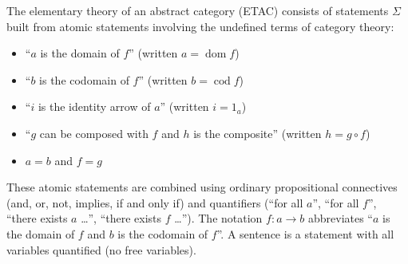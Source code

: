 The elementary theory of an abstract category (ETAC) consists of statements $\Sigma$ built from atomic statements involving the undefined terms of category theory:

\begin{itemize}
\item ``$a$ is the domain of $f$'' \quad (written $a = \operatorname{dom} f$)
\item ``$b$ is the codomain of $f$'' \quad (written $b = \operatorname{cod} f$)
\item ``$i$ is the identity arrow of $a$'' \quad (written $i = 1_a$)
\item ``$g$ can be composed with $f$ and $h$ is the composite'' \quad (written $h = g \circ f$)
\item $a = b$ and $f = g$
\end{itemize}

These atomic statements are combined using ordinary propositional connectives (and, or, not, implies, if and only if) and quantifiers (``for all $a$'', ``for all $f$'', ``there exists $a$ \ldots'', ``there exists $f$ \ldots''). The notation $f : a \rightarrow b$ abbreviates ``$a$ is the domain of $f$ and $b$ is the codomain of $f$''. A sentence is a statement with all variables quantified (no free variables).
